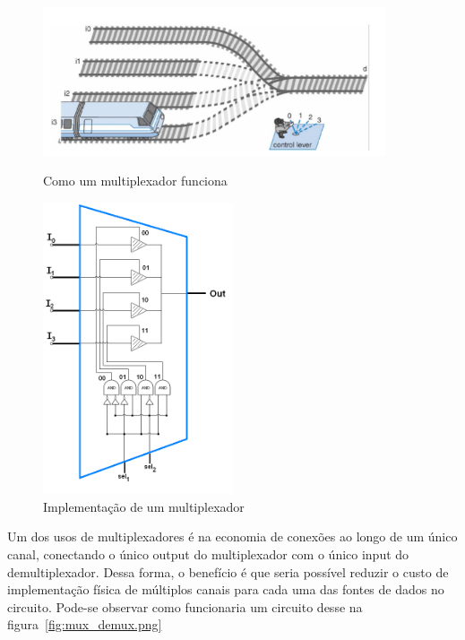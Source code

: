 \documentclass[12pt]{article}
\begin{document}
\begin{figure}[H]
    \centering
    \begin{minipage}{0.45\textwidth}
      \centering
      \includegraphics[width=0.9\textwidth]{Exp06/Images/mux.png}
      \caption{Como um multiplexador funciona}\label{fig:mux.png}
    \end{minipage}\hfill
    \begin{minipage}{0.45\textwidth}
      \centering
      \includegraphics[width=0.5\textwidth]{Exp06/Images/mux_wiki.png}
      \caption{Implementação de um multiplexador}\label{fig:mux_wiki.png}
    \end{minipage}\hfill
\end{figure}

Um dos usos de multiplexadores é na economia de conexões ao longo de um único
canal, conectando o único output do multiplexador com o único input do
demultiplexador. Dessa forma, o benefício é que seria possível reduzir o custo
de implementação física de múltiplos canais para cada uma das fontes de dados no
circuito. Pode-se observar como funcionaria um circuito desse na
figura~\ref{fig:mux_demux.png}
\end{document}

